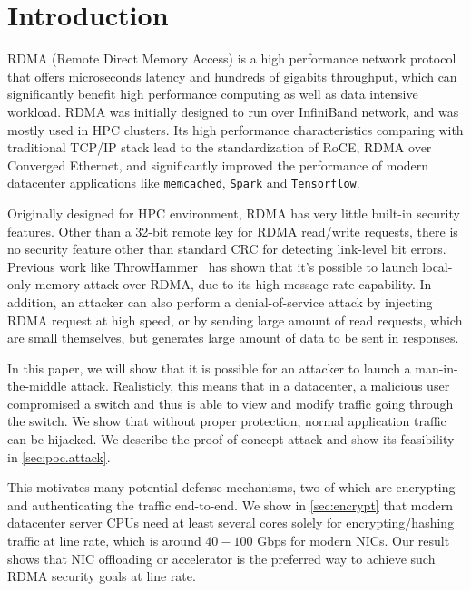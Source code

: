 \section{Introduction}
\label{sec:intro}

RDMA (Remote Direct Memory Access) is a high performance network protocol that offers microseconds latency and hundreds of gigabits throughput,
which can significantly benefit high performance computing as well as data intensive workload. RDMA was initially designed to run over InfiniBand network,
and was mostly used in HPC clusters. Its high performance characteristics comparing with traditional TCP/IP stack lead to the standardization of RoCE,
RDMA over Converged Ethernet, and significantly improved the performance of modern datacenter applications like \texttt{memcached}, \texttt{Spark} and \texttt{Tensorflow}.

Originally designed for HPC environment, RDMA has very little built-in security features. Other than a 32-bit remote key for RDMA read/write requests,
there is no security feature other than standard CRC for detecting link-level bit errors. Previous work like ThrowHammer~\cite{216055} has shown that
it's possible to launch local-only memory attack over RDMA, due to its high message rate capability. In addition, an attacker can also perform a
denial-of-service attack by injecting RDMA request at high speed, or by sending large amount of read requests, which are small themselves, but
generates large amount of data to be sent in responses.

In this paper, we will show that it is possible for an attacker to launch a man-in-the-middle attack. Realisticly, this means that in a datacenter,
a malicious user compromised a switch and thus is able to view and modify traffic going through the switch. We show that without proper protection,
normal application traffic can be hijacked. We describe the proof-of-concept attack and show its feasibility in \autoref{sec:poc.attack}.

This motivates many potential defense mechanisms, two of which are encrypting and authenticating the traffic end-to-end.
We show in \autoref{sec:encrypt} that modern datacenter server CPUs need at least several cores solely
for encrypting/hashing traffic at line rate, which is around $40 - 100$ Gbps for modern NICs.
Our result shows that NIC offloading or accelerator is the preferred way to achieve such RDMA security goals at line rate.








